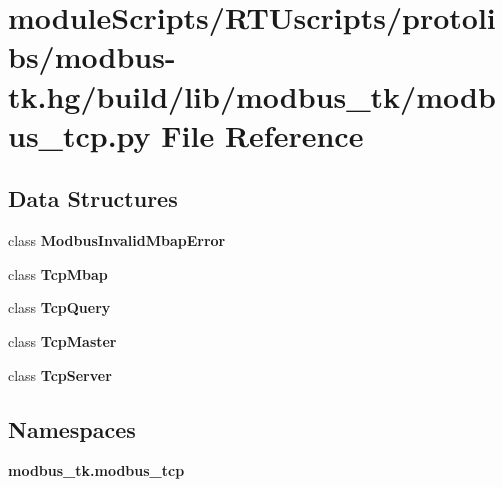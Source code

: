 \section{module\+Scripts/\+R\+T\+Uscripts/protolibs/modbus-\/tk.hg/build/lib/modbus\+\_\+tk/modbus\+\_\+tcp.py File Reference}
\label{modbus-tk_8hg_2build_2lib_2modbus__tk_2modbus__tcp_8py}
\subsection*{Data Structures}
\begin{DoxyCompactItemize}
\item 
class {\bf Modbus\+Invalid\+Mbap\+Error}
\item 
class {\bf Tcp\+Mbap}
\item 
class {\bf Tcp\+Query}
\item 
class {\bf Tcp\+Master}
\item 
class {\bf Tcp\+Server}
\end{DoxyCompactItemize}
\subsection*{Namespaces}
\begin{DoxyCompactItemize}
\item 
 {\bf modbus\+\_\+tk.\+modbus\+\_\+tcp}
\end{DoxyCompactItemize}
